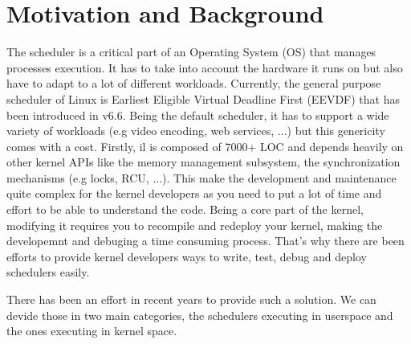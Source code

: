 \section{Motivation and Background}

\par The scheduler is a critical part of an Operating System (OS) that manages processes execution. It has to take into account the hardware it runs on but also have to adapt to a lot of different workloads. Currently, the general purpose scheduler of Linux is Earliest Eligible Virtual Deadline First (EEVDF) that has been introduced in v6.6. Being the default scheduler, it has to support a wide variety of workloads (e.g video encoding, web services,  ...) but this genericity comes with a cost. Firstly, il is composed of 7000+ LOC and depends heavily on other kernel APIs like the memory management subsystem, the synchronization mechanisms (e.g locks, RCU, ...). This make the development and maintenance quite complex for the kernel developers as you need to put a lot of time and effort to be able to understand the code. Being a core part of the kernel, modifying it requires you to recompile and redeploy your kernel, making the developemnt and debuging a time consuming process. That's why there are been efforts to provide kernel developers ways to write, test, debug and deploy schedulers easily. \\ \newline


\par There has been an effort in recent years to provide such a solution. We can devide those in two main categories, the schedulers executing in userspace and the ones executing in kernel space. \\

